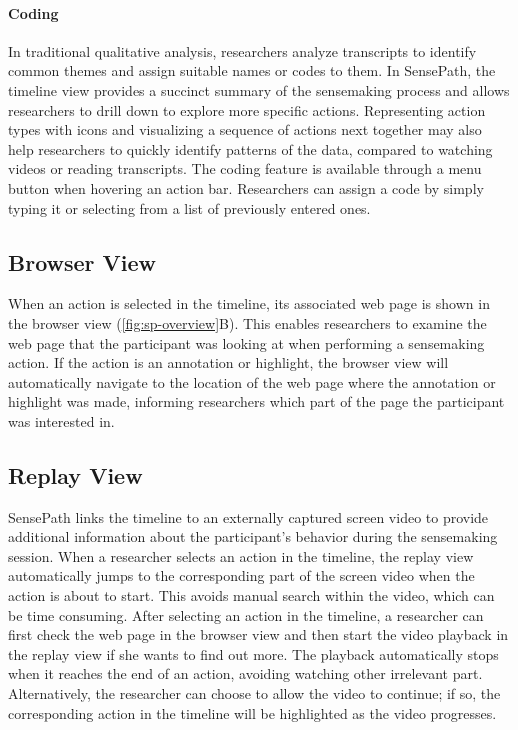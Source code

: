 \paragraph{Coding}
In traditional qualitative analysis, researchers analyze transcripts to identify common themes and assign suitable names or codes to them. In SensePath, the timeline view provides a succinct summary of the sensemaking process and allows researchers to drill down to explore more specific actions. Representing action types with icons and visualizing a sequence of actions next together may also help researchers to quickly identify patterns of the data, compared to watching videos or reading transcripts. The coding feature is available through a menu button when hovering an action bar. Researchers can assign a code by simply typing it or selecting from a list of previously entered ones.

\subsection{Browser View}
\label{sub:webpage}
When an action is selected in the timeline, its associated web page is shown in the browser view (\autoref{fig:sp-overview}B). This enables researchers to examine the web page that the participant was looking at when performing a sensemaking action. If the action is an annotation or highlight, the browser view will automatically navigate to the location of the web page where the annotation or highlight was made, informing researchers which part of the page the participant was interested in.

\subsection{Replay View}
\label{sub:playback}
SensePath links the timeline to an externally captured screen video to provide additional information about the participant's behavior during the sensemaking session. When a researcher selects an action in the timeline, the replay view automatically jumps to the corresponding part of the screen video when the action is about to start. This avoids manual search within the video, which can be time consuming. After selecting an action in the timeline, a researcher can first check the web page in the browser view and then start the video playback in the replay view if she wants to find out more. The playback automatically stops when it reaches the end of an action, avoiding watching other irrelevant part. Alternatively, the researcher can choose to allow the video to continue; if so, the corresponding action in the timeline will be highlighted as the video progresses.


